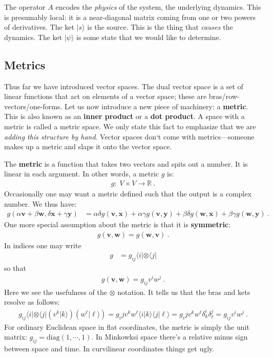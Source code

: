 \documentclass[12pt]{article}
\numberwithin{equation}{section}    %
\renewcommand{\vec}[1]{\mathbf{#1}} %
\begin{document}
The operator $A$ encodes the \emph{physics} of the system, the underlying dynamics.
%
This is presumably local: it is a near-diagonal matrix coming from one or two powers of derivatives.  The ket $|s\rangle$ is the source. This is the thing that \emph{causes} the dynamics. The ket $|\psi\rangle$ is some state that we would like to determine. 

\subsection{Metrics}

Thus far we have introduced vector spaces. The dual vector space is a set of linear functions that act on elements of a vector space; these are bras/row-vectors/one-forms. Let us now introduce a new piece of machinery: a \textbf{metric}. This is also known as an \textbf{inner product} or a \textbf{dot product}. A space with a metric is called a metric space. We only state this fact to emphasize that we are \emph{adding this structure by hand}. Vector spaces don‘t come with metrics---someone makes up a metric and slaps it onto the vector space.

The \textbf{metric} is a function that takes two vectors and spits out a number. It is linear in each argument. In other words, a metric $g$ is:
\begin{align}
  g:\; V\times V\to \mathbb{R} \ .
\end{align}
Occasionally one may want a metric defined such that the output is a complex number. We thus have:
\begin{align}
  g(\alpha \vec{v} + \beta\vec{w}, \delta \vec{x} + \gamma \vec{y})
  &= 
  \alpha \delta g(\vec{v},\vec{x}) + \alpha \gamma g(\vec{v},\vec{y}) + \beta\delta g(\vec{w},\vec{x}) + \beta\gamma g(\vec{w},\vec{y}) \ .
\end{align}
One more special assumption about the metric is that it is \textbf{symmetric}:
\begin{align}
  g(\vec{v},\vec{w}) = g(\vec{w}, \vec{v}) \ .
\end{align}
In indices one may write
\begin{align}
  g &= g_{ij} \langle i | \otimes \langle j |
\end{align}
so that
\begin{align}
  g(\vec{v}, \vec{w}) = g_{ij} v^{i}w^j \ .
 \end{align}
 Here we see the usefulness of the $\otimes$ notation. It tells us that the bras and kets resolve as follows:
 \begin{align}
   g_{ij}\langle i | \otimes \langle j | \left(v^k|k\rangle\right)\left(w^\ell|\ell\rangle\right) 
   = 
   g_ij v^k w^\ell 
   \langle i | k\rangle \langle j |\ell\rangle
   = 
   g_ij v^k w^\ell  \delta^i_k \delta^j_\ell 
   = 
   g_{ij} v^{i}w^j \ .
 \end{align}
 For ordinary Euclidean space in flat coordinates, the metric is simply the unit matrix: $g_{ij} = \text{diag}(1,\cdots, 1)$. In Minkowksi space there’s a relative minus sign between space and time. In curvilinear coordinates things get ugly. 
 
\end{document}
